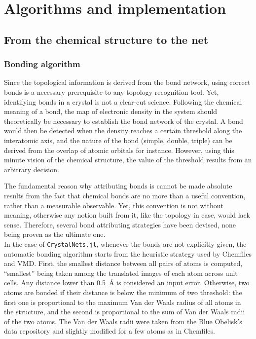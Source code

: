 \documentclass[main.tex]{subfiles}
\begin{document}
\section{Algorithms and implementation}

\subsection{From the chemical structure to the net}

\subsubsection{Bonding algorithm}
\label{bondingalgorithm}

Since the topological information is derived from the bond network, using correct bonds is a necessary prerequisite to any topology recognition tool. Yet, identifying bonds in a crystal is not a clear-cut science. %
Following the chemical meaning of a bond, the map of electronic density in the system should theoretically be necessary to establish the bond network of the crystal. A bond would then be detected when the density reaches a certain threshold along the interatomic axis, and the nature of the bond (simple, double, triple) can be derived from the overlap of atomic orbitals for instance. However, using this minute vision of the chemical structure, the value of the threshold results from an arbitrary decision.

The fundamental reason why attributing bonds is cannot be made absolute results from the fact that chemical bonds are no more than a useful convention, rather than a measurable observable. Yet, this convention is not without meaning, otherwise any notion built from it, like the topology in case, would lack sense. Therefore, several bond attributing strategies have been devised, none being proven as the ultimate one. %
\\

In the case of \texttt{CrystalNets.jl}, whenever the bonds are not explicitly given, the automatic bonding algorithm starts from the heuristic strategy used by Chemfiles and VMD. First, the smallest distance between all pairs of atoms is computed, ``smallest'' being taken among the translated images of each atom across unit cells. Any distance lower than \qty{0.5}{\angstrom} is considered an input error. Otherwise, two atoms are bonded if their distance is below the minimum of two threshold: the first one is proportional to the maximum Van der Waals radius of all atoms in the structure, and the second is proportional to the sum of Van der Waals radii of the two atoms. The Van der Waals radii were taken from the Blue Obelisk's data repository and slightly modified for a few atoms as in Chemfiles.
\end{document}
